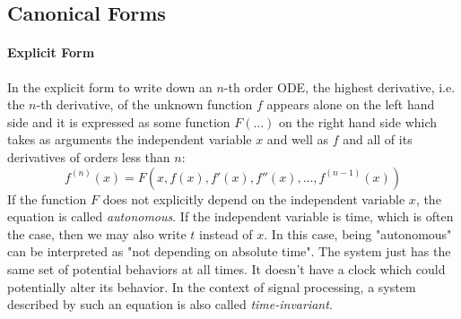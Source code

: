 



\subsection{Canonical Forms}


\paragraph{Explicit Form}
In the explicit form to write down an $n$-th order ODE, the highest derivative, i.e. the $n$-th derivative, of the unknown function $f$ appears alone on the left hand side and it is expressed as some function $F(\ldots)$ on the right hand side which takes as arguments the independent variable $x$ and well as $f$ and all of its derivatives of orders less than $n$:
\begin{equation}
f^{(n)}(x) = F(x, f(x), f'(x), f''(x), \ldots, f^{(n-1)}(x))
\end{equation}
If the function $F$ does not explicitly depend on the independent variable $x$, the equation is called \emph{autonomous}. If the independent variable is time, which is often the case, then we may also write $t$ instead of $x$. In this case, being "autonomous" can be interpreted as "not depending on absolute time". The system just has the same set of potential behaviors at all times. It doesn't have a clock which could potentially alter its behavior. In the context of signal processing, a system described by such an equation is also called \emph{time-invariant}.

